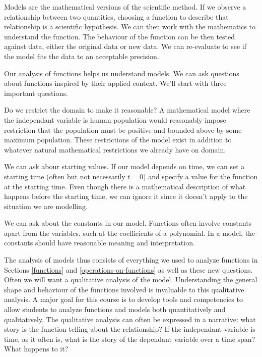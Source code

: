 \documentclass[fleqn]{report}
\begin{document}
Models are the mathematical versions of the scientific method.
If we observe a relationship between two quantities, choosing
a function to describe that relationship is a scientific
hypothesis. We can then work with the mathematics to
understand the function. The behaviour of the function can be
then tested against data, either the original data or new
data. We can re-evaluate to see if the model fits the data to
an acceptable precision.

Our analysis of functions helps us understand models. 
We can ask questions about functions inspired by
their applied context. We'll  start with three important
questions.

\begin{smallitemize}
\item Do we restrict the domain to make it reasonable? A
mathematical model where the independant variable is human
population would reasonably impose restriction that the
population must be positive and bounded above by some maximum
population. These restrictions of the model exist in addition
to whatever natural mathematical restrictions we already have
on domain.
\item We can ask abour starting values. If our model depends
on time, we can set a starting time (often but not necessarily
$t=0$) and specify a value for the function at the starting
time. Even though there is a mathematical description of what
happens before the starting time, we can ignore it since it
doesn't apply to the situation we are modelling.
\item We can ask about the constants in our model. Functions
often involve constants apart from the variables, such at the
coefficients of a polynomial. In a model, the constants should
have reasonable meaning and interpretation. 
\end{smallitemize}

The analysis of models thus consists of everything we used to
analyze functions in Sections \ref{functions} and
\ref{operations-on-functions} as well as these new
questions. Often we will want a qualitative analysis of the
model. Understanding the general shape and behaviour of the
functions involved is invaluable to this qualitative analysis.
A major goal for this course is to develop tools and
competencies to allow students to analyze functions and
models both quantitatively and qualitatively. The
qualitative analysis can often be expressed in a narrative:
what story is the function telling about the relationship? If
the independant variable is time, as it often is, what is the
story of the dependant variable over a time span? What
happens to it? 
\end{document}
